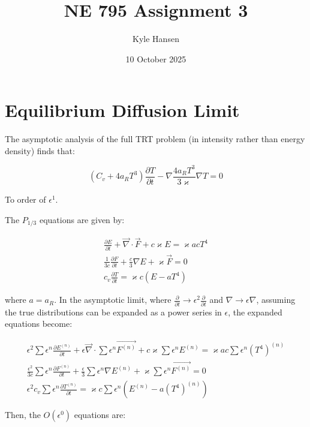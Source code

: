 \documentclass{template}
\title{NE 795 Assignment 3}
\author{Kyle Hansen}
\date{10 October 2025}
\begin{document}
\maketitle

\section{Equilibrium Diffusion Limit}

The asymptotic analysis of the full TRT problem (in intensity rather than energy density) finds that:

\begin{equation*}
  (C_v + 4a_R T^3)\frac{\partial T}{\partial t} - \nabla \frac{4a_R T^3}{3\varkappa}\nabla T = 0
\end{equation*}

To order of $\epsilon^1$.

The $P_{1/3}$ equations are given by:

\begin{gather*}
  \frac{\partial E}{\partial t} + \vec{\nabla}\cdot\vec{F} + c \varkappa E = \varkappa a c T^4\\
  \frac{1}{3c}\frac{\partial F}{\partial t} + \frac{c}{3}\nabla E + \varkappa \vec{F} = 0\\
  c_v \frac{\partial T}{\partial t} = \varkappa c \left( E - aT^4 \right)
\end{gather*}

where $a = a_R$. In the asymptotic limit, where $\frac{\partial}{\partial t} \rightarrow \epsilon^2 \frac{\partial}{\partial t}$ and $\nabla \rightarrow \epsilon \nabla$, assuming the true distributions can be expanded as a power series in $\epsilon$, the expanded equations become:

\begin{gather}
  \epsilon^2 \sum \epsilon^n \frac{\partial E^{(n)}}{\partial t} + \epsilon\vec{\nabla} \cdot \sum \epsilon^n \vec{F^{(n)}} + c \varkappa \sum \epsilon^n E^{(n)} = \varkappa a c \sum \epsilon^n \left(T^4\right)^{(n)}\\
  \frac{\epsilon^2}{3c} \sum \epsilon^n\frac{\partial F^{(n)}}{\partial t} + \frac{\epsilon}{3} \sum \epsilon^n\nabla E^{(n)} + \varkappa \sum \epsilon^n \vec{F^{(n)}} = 0\\
  \epsilon^2 c_v \sum \epsilon^n \frac{\partial T^{(n)}}{\partial t} = \varkappa c \sum \epsilon^n \left( E^{(n)} - a\left(T^4\right)^{(n)} \right)
\end{gather}

Then, the $O(\epsilon^0)$ equations are:
\end{document}
